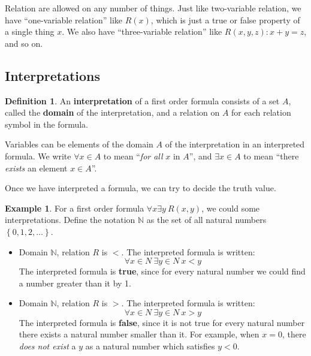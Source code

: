 \documentclass[11pt]{article}
\theoremstyle{definition}
\newtheorem{defn}{Definition}[subsection]
\newtheorem{eg}{Example}[subsection]
\begin{document}
Relation are allowed on any number of things. Just like two-variable relation, we have ``one-variable relation'' like $R(x)$, which is just a true or false property of a single thing $x$. We also have ``three-variable relation'' like $R(x,y,z):x+y=z$, and so on.


\subsection{Interpretations}
\begin{shaded}
    \begin{defn}
        An \textbf{interpretation} of a first order formula consists of a set $A$, called the \textbf{domain} of the interpretation, and a relation on $A$ for each relation symbol in the formula.
    \end{defn}
\end{shaded}

Variables can be elements of the domain $A$ of the interpretation in an interpreted formula. We write $\forall x \in A$ to mean ``\textit{for all} $x$ in $A$'', and $\exists x \in A$ to mean ``there \textit{exists} an element $x \in A$''.

Once we have interpreted a formula, we can try to decide the truth value.

\begin{eg}
    For a first order formula $\forall x \exists y \: R(x,y)$, we could some interpretations. Define the notation $\mathbb{N}$ as the set of all natural numbers $\left\{ 0,1,2,\dots \right\}$.

    \begin{itemize}
        \item Domain $\mathbb{N}$, relation $R$ is $<$. The interpreted formula is written: \begin{equation}
            \forall x \in N \: \exists y \in N \: x<y
        \end{equation}
        The interpreted formula is \textbf{true}, since for every natural number we could find a number greater than it by 1.
        \item Domain $\mathbb{N}$, relation $R$ is $>$. The interpreted formula is written: \begin{equation}
            \forall x \in N \: \exists y \in N \: x>y
        \end{equation}
        The interpreted formula is \textbf{false}, since it is not true for every natural number there exists a natural number smaller than it. For example, when $x=0$, there \textit{does not exist} a $y$ as a natural number which satisfies $y<0$.
    \end{itemize}

\end{eg}
\end{document}
